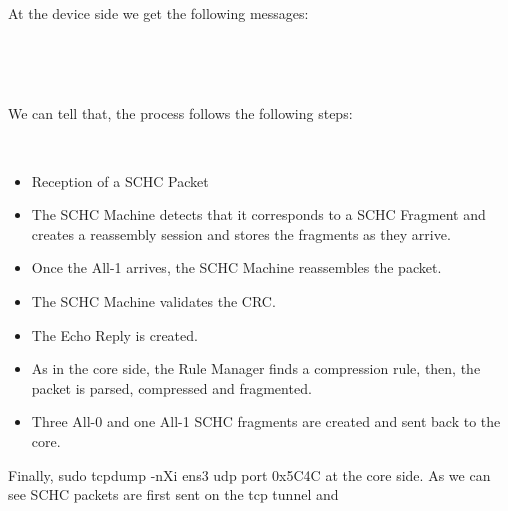 ~

At the device side we get the following messages:

~



~

We can tell that, the process follows the following steps:

~

\begin{itemize}
    \item Reception of a SCHC Packet
    \item The SCHC Machine detects that it corresponds to a SCHC Fragment and creates a reassembly session and stores the fragments as they arrive.
    \item Once the All-1 arrives, the SCHC Machine reassembles the packet.
    \item The SCHC Machine validates the CRC.
    \item The Echo Reply is created.
    \item As in the core side, the Rule Manager finds a compression rule, then, the packet is parsed, compressed and fragmented.
    \item Three All-0 and one All-1 SCHC fragments are created and sent back to the core.
\end{itemize}

Finally, sudo tcpdump -nXi ens3 udp port 0x5C4C at the core side. 
As we can see SCHC packets are first sent on the tcp tunnel and


